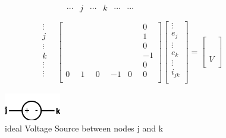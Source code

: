 \begin{align}
	& \begin{matrix}
	& \cdots & j & \cdots & k & \cdots & \cdots\\[-6pt]
	\end{matrix}\\
	\begin{matrix}
	\vdots\\
	j\\
	\vdots\\
	k\\
	\vdots\\
	\vdots\\
	\end{matrix}
	& \begin{bmatrix}
	\quad & \quad & \quad & \quad & \quad & 0\\[6pt]
	& & & & & 1\\[6pt]
	& & & & & 0\\[6pt]
	& & & & & -1\\[6pt]
	& & & & & 0\\[6pt]
	0 & 1 & 0 & -1 & 0 & 0\\
	\end{bmatrix}
	\begin{bmatrix}
	\vdots \\
	e_j\\[6pt]
	\vdots \\
	e_k\\[6pt]
	\vdots\\
	i_{jk}\\
	\end{bmatrix}
	=
	\begin{bmatrix}
	\\[6pt]
	\\[6pt]
	\\[6pt]
	\\[6pt]
	\\[6pt]
	V\\
	\end{bmatrix}	
\end{align}

\begin{figure}[h]
	\centering
	\includegraphics[scale=0.8]{img/IdealVoltageSource.png}
	\caption{ideal Voltage Source between nodes j and k}
	\label{fig:IdealVSource}
\end{figure}

